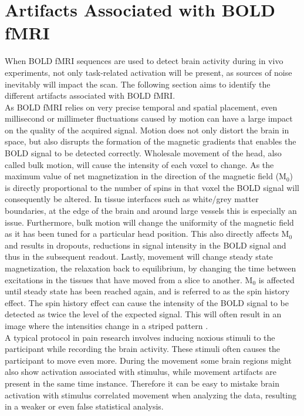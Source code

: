 \section{Artifacts Associated with BOLD fMRI} \label{sec:noise}

When BOLD fMRI sequences are used to detect brain activity during in vivo experiments, not only task-related activation will be present, as sources of noise  inevitably will impact the scan. \cite{Salimi-Khorshidi2014} The following section aims to identify the different artifacts associated with BOLD fMRI. \\
As BOLD fMRI relies on very precise temporal and spatial placement, even millisecond or millimeter fluctuations caused by motion can have a large impact on the quality of the acquired signal. Motion does not only distort the brain in space, but also disrupts the formation of the magnetic gradients that enables the BOLD signal to be detected correctly. Wholesale movement of the head, also called bulk motion, will cause the intensity of each voxel to change. As the maximum value of net magnetization in the direction of the magnetic field (M$_0$) is directly proportional to the number of spins in that voxel the BOLD signal will consequently be altered. In tissue interfaces such as white/grey matter boundaries, at the edge of the brain and around large vessels this is especially an issue. Furthermore, bulk motion will change the uniformity of the magnetic field as it has been tuned for a particular head position. This also directly affects M$_0$ and results in dropouts, reductions in signal intensity in the BOLD signal and thus in the subsequent readout. Lastly, movement will change steady state magnetization, the relaxation back to equilibrium, by changing the time between excitations in the tissues that have moved from a slice to another. M$_0$ is affected until steady state has been reached again, and is referred to as the spin history effect. The spin history effect can cause the intensity of the BOLD signal to be detected as twice the level of the expected signal. \cite{Murphy2013} This will often result in an image where the intensities change in a striped pattern \cite{Poldrack2011}. \\
A typical protocol in pain research involves inducing noxious stimuli to the participant while recording the brain activity. These stimuli often causes the participant to move even more. During the movement some brain regions might also show activation associated with stimulus, while movement artifacts are present in the same time instance. Therefore it can be easy to mistake brain activation with stimulus correlated movement when analyzing the data, resulting in a weaker or even false statistical analysis. \cite{Poldrack2011} \\
